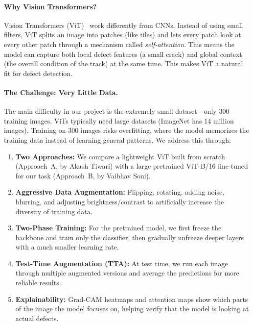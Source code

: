 \documentclass[10pt,twocolumn,letterpaper]{article}
\begin{document}
\paragraph{Why Vision Transformers?}
Vision Transformers (ViT)~\cite{Dosovitskiy2021} work differently from CNNs. Instead of using small filters, ViT splits an image into patches (like tiles) and lets every patch look at every other patch through a mechanism called \textit{self-attention}. This means the model can capture both local defect features (a small crack) and global context (the overall condition of the track) at the same time. This makes ViT a natural fit for defect detection.

\paragraph{The Challenge: Very Little Data.}
The main difficulty in our project is the extremely small dataset---only 300 training images. ViTs typically need large datasets (ImageNet has 14 million images). Training on 300 images risks overfitting, where the model memorizes the training data instead of learning general patterns. We address this through:

\begin{enumerate}[leftmargin=*, itemsep=2pt]
    \item \textbf{Two Approaches:} We compare a lightweight ViT built from scratch (Approach~A, by Akash Tiwari) with a large pretrained ViT-B/16 fine-tuned for our task (Approach~B, by Vaibhav Soni).
    \item \textbf{Aggressive Data Augmentation:} Flipping, rotating, adding noise, blurring, and adjusting brightness/contrast to artificially increase the diversity of training data.
    \item \textbf{Two-Phase Training:} For the pretrained model, we first freeze the backbone and train only the classifier, then gradually unfreeze deeper layers with a much smaller learning rate.
    \item \textbf{Test-Time Augmentation (TTA):} At test time, we run each image through multiple augmented versions and average the predictions for more reliable results.
    \item \textbf{Explainability:} Grad-CAM heatmaps and attention maps show which parts of the image the model focuses on, helping verify that the model is looking at actual defects.
\end{enumerate}

\end{document}
